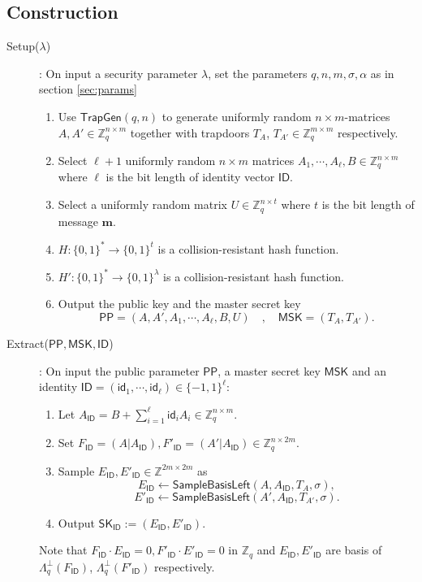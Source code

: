 \documentclass[runningheads,10pt]{llncs}
\def\ZZ{\mathbb{Z}}
\def\bf{\mathbf}
\def\TrapGen{\mathsf{TrapGen}}
\def\SK{\mathsf{SK}}
\def\PP{\mathsf{PP}}
\def\MSK{\mathsf{MSK}}
\def\SampleBasisLeft{\mathsf{SampleBasisLeft}}
\def\e{\bf{e}}
\def\m{\bf{m}}
\def\ID{\mathsf{ID}}
\def\id{\mathsf{id}}
\begin{document}
\subsection{Construction}
\begin{description}
	\item[Setup($\lambda$)]: On input a security parameter $\lambda$, set the parameters $q,n,m,\sigma,\alpha$ as in section \ref{sec:params}
	\begin{enumerate}
		\item Use $\TrapGen(q,n)$ to generate uniformly random $n\times m$-matrices $A, A'\in\ZZ_q^{n\times m}$ together with trapdoors $T_{A}$, $T_{A'}\in\ZZ_q^{m\times m}$ respectively.
		\item Select $\ell+1$ uniformly random $n\times m$ matrices $A_1,\cdots,A_\ell,B\in\ZZ_q^{n\times m}$ where $\ell$ is the bit length of identity vector $\ID$.
		\item Select a uniformly random matrix $U\in\ZZ_q^{n\times t}$ where $t$ is the bit length of message $\m$.
		\item $H: \{0,1\}^*\to \{0,1\}^t$ is a collision-resistant hash function.
		\item $H': \{0,1\}^*\to \{0,1\}^\lambda$ is a collision-resistant hash function.
		\item Output the public key and the master secret key
		$$\PP=(A,A',A_1,\cdots,A_\ell,B,U)\quad,\quad \MSK=(T_A,T_{A'}).$$
	\end{enumerate} 
	
	\item[Extract($\PP,\MSK,\ID$)]: On input the public parameter $\PP$, a master secret key $\MSK$ and an identity $\ID=(\id_1,\cdots,\id_\ell)\in\{-1,1\}^\ell$:
	
	\begin{enumerate}
		\item Let $A_{\ID} = B + \sum_{i=1}^\ell\id_iA_i\in\ZZ_q^{n\times m}$.
		\item Set $F_\ID=(A|A_\ID), F'_\ID=(A'|A_\ID)\in\ZZ_q^{n\times 2m}$.
		\item Sample $E_{\ID}, E'_{\ID}\in\ZZ^{2m\times 2m}$ as 
		$$E_{\ID}\gets\SampleBasisLeft(A,A_{\ID},T_A,\sigma),$$
		$$E'_{\ID}\gets\SampleBasisLeft(A',A_{\ID},T_{A'},\sigma).$$
		\item Output $\SK_\ID:=(E_{\ID},E'_{\ID})$.
	\end{enumerate}
	Note that $F_\ID\cdot E_{\ID} = 0, F'_\ID\cdot E'_{\ID} = 0$ in $\ZZ_q$ and $E_{\ID},E'_{\ID}$ are basis of $\Lambda_q^\perp(F_\ID)$, $\Lambda_q^\perp(F'_\ID)$ respectively.\\
	

\end{description}
\end{document}
